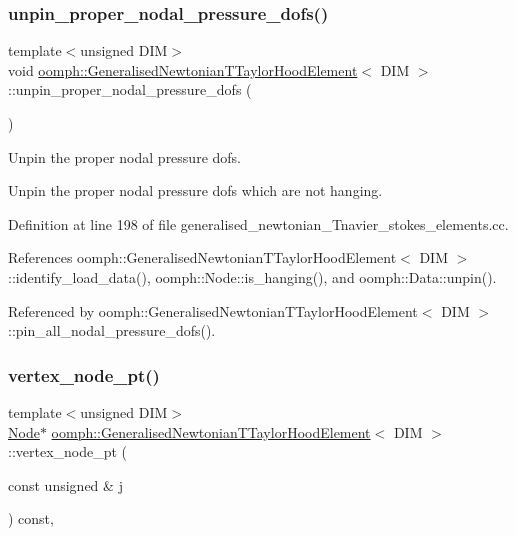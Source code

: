 \subsubsection{\texorpdfstring{unpin\+\_\+proper\+\_\+nodal\+\_\+pressure\+\_\+dofs()}{unpin\_proper\_nodal\_pressure\_dofs()}}
{\footnotesize\ttfamily template$<$unsigned D\+IM$>$ \\
void \hyperlink{classoomph_1_1GeneralisedNewtonianTTaylorHoodElement}{oomph\+::\+Generalised\+Newtonian\+T\+Taylor\+Hood\+Element}$<$ D\+IM $>$\+::unpin\+\_\+proper\+\_\+nodal\+\_\+pressure\+\_\+dofs (\begin{DoxyParamCaption}{ }\end{DoxyParamCaption})\hspace{0.3cm}{\ttfamily [protected]}}



Unpin the proper nodal pressure dofs. 

Unpin the proper nodal pressure dofs which are not hanging. 

Definition at line 198 of file generalised\+\_\+newtonian\+\_\+\+Tnavier\+\_\+stokes\+\_\+elements.\+cc.



References oomph\+::\+Generalised\+Newtonian\+T\+Taylor\+Hood\+Element$<$ D\+I\+M $>$\+::identify\+\_\+load\+\_\+data(), oomph\+::\+Node\+::is\+\_\+hanging(), and oomph\+::\+Data\+::unpin().



Referenced by oomph\+::\+Generalised\+Newtonian\+T\+Taylor\+Hood\+Element$<$ D\+I\+M $>$\+::pin\+\_\+all\+\_\+nodal\+\_\+pressure\+\_\+dofs().

\mbox{\label{classoomph_1_1GeneralisedNewtonianTTaylorHoodElement_a9de1770248ec1624dcb594f2116f7274}} 
\subsubsection{\texorpdfstring{vertex\+\_\+node\+\_\+pt()}{vertex\_node\_pt()}}
{\footnotesize\ttfamily template$<$unsigned D\+IM$>$ \\
\hyperlink{classoomph_1_1Node}{Node}$\ast$ \hyperlink{classoomph_1_1GeneralisedNewtonianTTaylorHoodElement}{oomph\+::\+Generalised\+Newtonian\+T\+Taylor\+Hood\+Element}$<$ D\+IM $>$\+::vertex\+\_\+node\+\_\+pt (\begin{DoxyParamCaption}\item[{const unsigned \&}]{j }\end{DoxyParamCaption}) const\hspace{0.3cm}{\ttfamily [inline]}, {\ttfamily [virtual]}}



